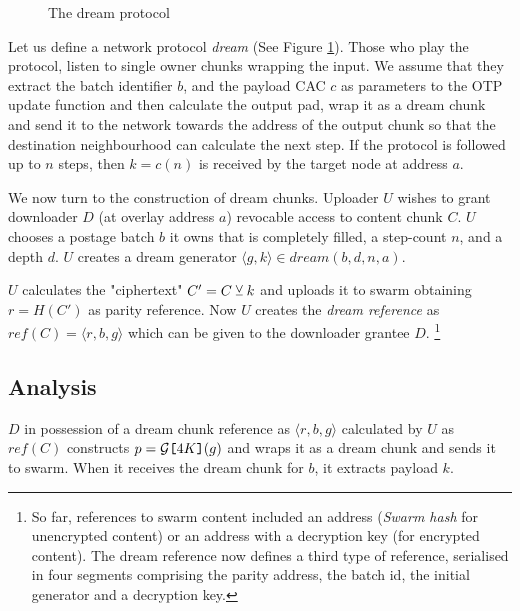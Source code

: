 \begin{figure}[htbp]
  \centering
  \caption{The dream protocol}
\label{fig:protocol}
\end{figure}


Let us  define a network protocol \emph{dream} (See Figure \ref{fig:protocol}). Those who play the protocol, listen to single owner chunks wrapping the input.
We assume that they extract the batch identifier $b$, and the payload CAC $c$ as parameters to the OTP update function and then calculate the output pad, wrap it as a dream chunk and send it to the network towards the address of the output chunk so that the destination neighbourhood 
can calculate the next step. If the protocol is followed up to $n$ steps, then $k=c(n)$ is received by the target node at address $a$. 


We now turn to the construction of dream chunks. 
Uploader $U$ wishes to grant downloader $D$ (at overlay address $a$) revocable  access to content chunk $C$.
$U$  chooses a postage batch $b$ it owns that is completely filled, a step-count $n$, and a depth $d$.
$U$ creates a dream generator $\langle g, k\rangle\in\mathit{dream}(b,d,n,a)$.              

$U$ calculates the "ciphertext" $C'=C \veebar k$ and uploads it to swarm obtaining $r=\mathit{H}(C')$ as parity reference. Now $U$ creates the \emph{dream reference} as $\mathit{ref}(C)=\langle r,b,g\rangle $ which can be given to the downloader grantee $D$.%
%
\footnote{So far, references to swarm content included an address (\emph{Swarm hash} for unencrypted content) or an address with a decryption key (for encrypted content). The dream reference now defines a third type of reference, serialised in four segments comprising the parity address, the batch id, the initial generator and a decryption key.}

\subsection{Analysis}

$D$ in possession of a dream chunk reference as 
$\langle r,b,g\rangle $ calculated by $U$  as $\mathit{ref}(C)$ constructs $p=\mathcal{G}\texttt{[}\/4K\/\texttt{]}(g)$ and wraps it as a dream chunk and sends it to swarm. When it receives the dream chunk for $b$, it extracts payload $k$.

